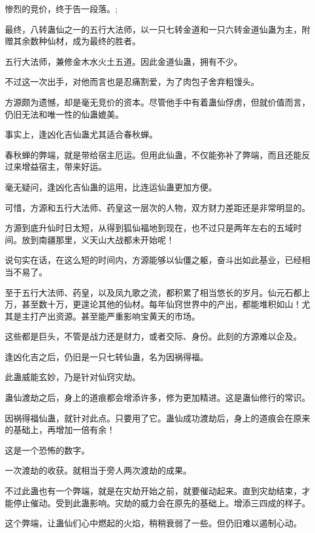 
\begin{this_body}

惨烈的竞价，终于告一段落。;

最终，八转蛊仙之一的五行大法师，以一只七转金道和一只六转金道仙蛊为主，附赠其余数种仙材，成为最终的胜者。

五行大法师，兼修金木水火土五道。因此金道仙蛊，拥有不少。

不过这一次出手，对他而言也是忍痛割爱，为了肉包子舍弃粗馒头。

方源颇为遗憾，却是毫无竞价的资本。尽管他手中有着蛊仙俘虏，但就价值而言，仍旧无法和唯一性的仙蛊媲美。

事实上，逢凶化吉仙蛊尤其适合春秋蝉。

春秋蝉的弊端，就是带给宿主厄运。但用此仙蛊，不仅能弥补了弊端，而且还能反过来增益宿主，带来好运。

毫无疑问，逢凶化吉仙蛊的运用，比连运仙蛊更加方便。

可惜，方源和五行大法师、药皇这一层次的人物，双方财力差距还是非常明显的。

方源到底升仙时日太短，从得到狐仙福地到现在，也不过只是两年左右的五域时间。放到南疆那里，义天山大战都未开始呢！

说句实在话，在这么短的时间内，方源能够以仙僵之躯，奋斗出如此基业，已经相当不易了。

至于五行大法师、药皇，以及凤九歌之流，都积累了相当悠长的岁月。仙元石都上万，甚至数十万，更遑论其他的仙材。每年仙窍世界中的产出，都能堆积如山！尤其是主打产出资源。甚至能严重影响宝黄天的市场。

这些都是巨头，不管是战力还是财力，或者交际、身份。此刻的方源难以企及。

逢凶化吉之后，仍旧是一只七转仙蛊，名为因祸得福。

此蛊威能玄妙，乃是针对仙窍灾劫。

蛊仙渡劫之后，身上的道痕都会增添许多，修为更加精进。这是蛊仙修行的常识。

因祸得福仙蛊，就针对此点。只要用了它。蛊仙成功渡劫后，身上的道痕会在原来的基础上，再增加一倍有余！

这是一个恐怖的数字。

一次渡劫的收获。就相当于旁人两次渡劫的成果。

不过此蛊也有一个弊端，就是在灾劫开始之前，就要催动起来。直到灾劫结束，才能停止催动。受到此蛊影响。灾劫的威力会在原先的基础上。增添三四成的样子。

这个弊端，让蛊仙们心中燃起的火焰，稍稍衰弱了一些。但仍旧难以遏制心动。


\end{this_body}
